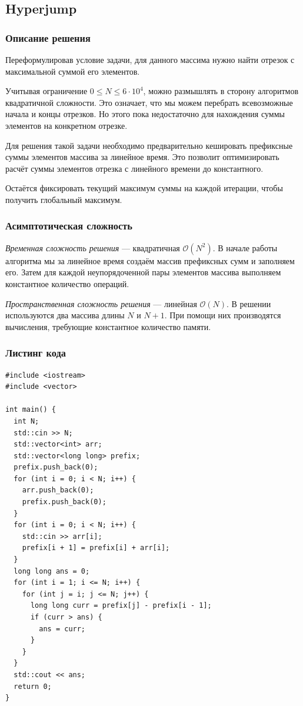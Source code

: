 \subsection{Hyperjump}

\subsubsection{Описание решения}

Переформулировав условие задачи, для данного массима нужно найти отрезок с максимальной суммой его элементов.

Учитывая ограничение \( 0\leq N\leq 6\cdot 10^4 \), можно размышлять в сторону алгоритмов квадратичной сложности. Это означает, что мы можем перебрать всевозможные начала и концы отрезков. Но этого пока недостаточно для нахождения суммы элементов на конкретном отрезке.

Для решения такой задачи необходимо предварительно кешировать префиксные суммы элементов массива за линейное время. Это позволит оптимизировать расчёт суммы элементов отрезка с линейного времени до константного.

Остаётся фиксировать текущий максимум суммы на каждой итерации, чтобы получить глобальный максимум.

\subsubsection{Асимптотическая сложность}

\textit{Временная сложность решения} --- квадратичная \( \mathcal{O}(N^2) \). В начале работы алгоритма мы за линейное время создаём массив префиксных сумм и заполняем его. Затем для каждой неупорядоченной пары элементов массива выполняем константное количество операций.

\textit{Пространственная сложность решения} --- линейная \( \mathcal{O}(N) \). В решении используются два массива длины \( N \) и \( N+1 \). При помощи них производятся вычисления, требующие константное количество памяти.

\subsubsection{Листинг кода}

\begin{lstlisting}
#include <iostream>
#include <vector>

int main() {
  int N;
  std::cin >> N;
  std::vector<int> arr;
  std::vector<long long> prefix;
  prefix.push_back(0);
  for (int i = 0; i < N; i++) {
    arr.push_back(0);
    prefix.push_back(0);
  }
  for (int i = 0; i < N; i++) {
    std::cin >> arr[i];
    prefix[i + 1] = prefix[i] + arr[i];
  }
  long long ans = 0;
  for (int i = 1; i <= N; i++) {
    for (int j = i; j <= N; j++) {
      long long curr = prefix[j] - prefix[i - 1];
      if (curr > ans) {
        ans = curr;
      }
    }
  }
  std::cout << ans;
  return 0;
}
\end{lstlisting}